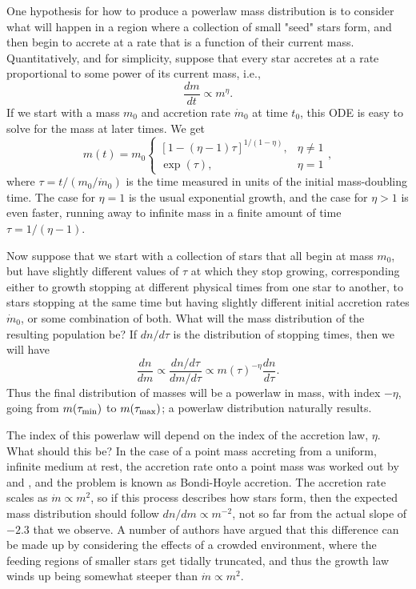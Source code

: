 One hypothesis for how to produce a powerlaw mass distribution is to consider what will happen in a region where a collection of small "seed" stars form, and then begin to accrete at a rate that is a function of their current mass. Quantitatively, and for simplicity, suppose that every star accretes at a rate proportional to some power of its current mass, i.e.,
\begin{equation}
\frac{dm}{dt} \propto m^\eta.
\end{equation}
If we start with a mass $m_0$ and accretion rate $\dot{m}_0$ at time $t_0$, this ODE is easy to solve for the mass at later times. We get
\begin{equation}
m(t) = m_0 \left\{
\begin{array}{ll}
[1 - (\eta-1)\tau]^{1/(1-\eta)}, & \eta \neq 1 \\
\exp(\tau), & \eta = 1
\end{array}
\right.,
\end{equation}
where $\tau = t / (m_0/\dot{m}_0)$ is the time measured in units of the initial mass-doubling time. The case for $\eta = 1$ is the usual exponential growth, and the case for $\eta > 1$ is even faster, running away to infinite mass in a finite amount of time $\tau = 1/(\eta-1)$.

Now suppose that we start with a collection of stars that all begin at mass $m_0$, but have slightly different values of $\tau$ at which they stop growing, corresponding either to growth stopping at different physical times from one star to another, to stars stopping at the same time but having slightly different initial accretion rates $\dot{m}_0$, or some combination of both. What will the mass distribution of the resulting population be? If $dn/d\tau$ is the distribution of stopping times, then we will have
\begin{equation}
\frac{dn}{dm} \propto \frac{dn/d\tau}{dm/d\tau} \propto m(\tau)^{-\eta} \frac{dn}{d\tau}.
\end{equation}
Thus the final distribution of masses will be a powerlaw in mass, with index $-\eta$, going from $m(\tau_{\rm min})$ to $m(\tau_{\rm max})$; a powerlaw distribution naturally results.

The index of this powerlaw will depend on the index of the accretion law, $\eta$. What should this be? In the case of a point mass accreting from a uniform, infinite medium at rest, the accretion rate onto a point mass was worked out by \citet{hoyle46a} and \citet{bondi52a}, and the problem is known as Bondi-Hoyle accretion. The accretion rate scales as $\dot{m} \propto m^2$, so if this process describes how stars form, then the expected mass distribution should follow $dn/dm\propto m^{-2}$, not so far from the actual slope of $-2.3$ that we observe. A number of authors have argued that this difference can be made up by considering the effects of a crowded environment, where the feeding regions of smaller stars get tidally truncated, and thus the growth law winds up being somewhat steeper than $\dot{m}\propto m^2$.

